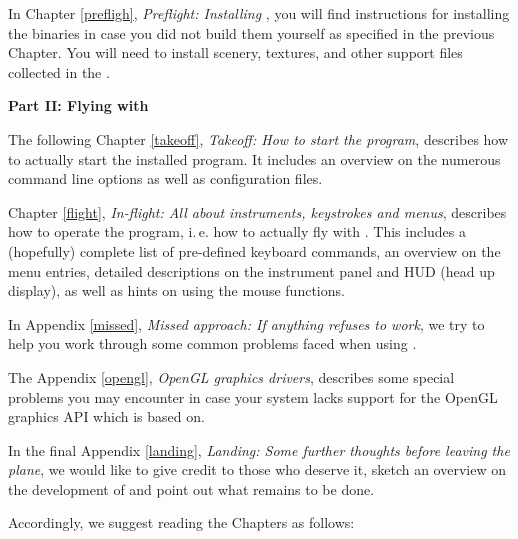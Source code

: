  \noindent
 In Chapter \ref{prefligh}, \textit{Preflight: Installing \FlightGear{}}, you will find
instructions for installing the binaries in case you did not
build them yourself as specified in the previous Chapter. You will need to install
scenery, textures, and other support files collected in the .
 \medskip

\noindent
\textbf{Part II: Flying with \FlightGear{}}
\medskip

 \noindent
  The following Chapter \ref{takeoff}, \textit{Takeoff: How to start the
program}, describes how to actually start the installed program. It includes an overview on the numerous command line options as well as configuration files.
 \medskip

 \noindent
 Chapter \ref{flight}, \textit{In-flight: All about instruments, keystrokes and menus},
describes how to operate the program, i.\,e. how to actually fly with
\FlightGear{}\hspace{-1mm}. This includes a (hopefully) complete list of pre-defined keyboard
commands, an overview on the menu entries, detailed descriptions on the instrument panel and
HUD (head up display), as well as hints on using the mouse functions.
 \medskip

 \noindent
  In Appendix \ref{missed}, \textit{Missed approach: If anything refuses to work},
   we try to help you work through some common problems faced when using \FlightGear{}.
 \bigskip

 \noindent
 The Appendix \ref{opengl}, \textit{OpenGL graphics drivers}, describes some special problems you may encounter in case your system lacks support for the OpenGL graphics API  which \FlightGear{} is based on. 
 \medskip

 \noindent
  In the final Appendix \ref{landing}, \textit{Landing: Some further thoughts before leaving the plane}, we would like to give credit to those who deserve it, sketch an overview
on the development of \FlightGear and point out what remains to be done.
 \medskip

 \noindent
 Accordingly, we suggest reading the Chapters as follows:
 \medskip


